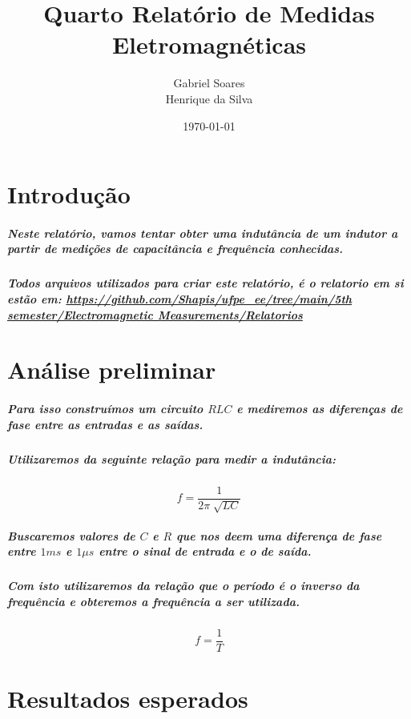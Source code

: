 \documentclass[12pt,twoside, a4paper, twocolumn]{article}
\title{Quarto Relatório de Medidas Eletromagnéticas}
\author{Gabriel Soares \\ Henrique da Silva}
\date{\today}
\begin{document}
\maketitle
{}
\newpage
\tableofcontents
\newpage






\section{Introdução}




\subparagraph*{Neste relatório, vamos tentar obter uma indutância de um indutor a partir de medições de capacitância e frequência conhecidas.}


\subparagraph*{Todos arquivos utilizados para criar este relatório, é o relatorio em si estão em:  \url{https://github.com/Shapis/ufpe_ee/tree/main/5th semester/Electromagnetic Measurements/Relatorios}}








\section{Análise preliminar}


\subparagraph*{Para isso construímos um circuito $RLC$ e mediremos as diferenças de fase entre as entradas e as saídas.}


\subparagraph*{Utilizaremos da seguinte relação para medir a indutância:}


\begin{equation}
    f = \frac{1}{2 \pi \sqrt[]{LC}}
\end{equation}


\subparagraph*{Buscaremos valores de $C$ e $R$ que nos deem uma diferença de fase entre $1ms$ e $1\mu s$ entre o sinal de entrada e o de saída.}


\subparagraph*{Com isto utilizaremos da relação que o período é o inverso da frequência e obteremos a frequência a ser utilizada.}


\begin{equation}
    f = \frac{1}{T}
\end{equation}


\section{Resultados esperados}
\end{document}
